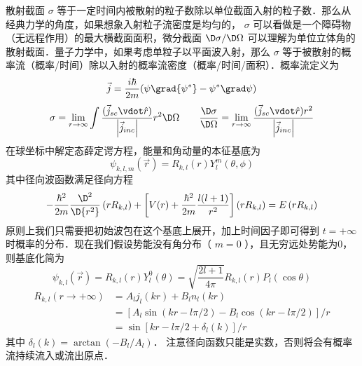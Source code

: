 
散射截面 $\sigma$ 等于一定时间内被散射的粒子数除以单位截面入射的粒子数．那么从经典力学的角度，如果想象入射粒子流密度是均匀的， $\sigma$ 可以看做是一个障碍物（无远程作用）的最大横截面面积，微分截面 $\D \sigma/\D\Omega$ 可以理解为单位立体角的散射截面．量子力学中，如果考虑单粒子以平面波入射，那么 $\sigma$ 等于被散射的概率流（概率/时间）除以入射的概率流密度（概率/时间/面积）．概率流定义为
\begin{equation}
\vec j = \frac{i\hbar }{2m}(\psi \grad {\psi ^ * } - {\psi ^ * }\grad \psi )
\end{equation}
\begin{equation}\label{ParWav_eq3}
\sigma  = \lim_{r \to \infty } \int {\frac{{\text{(}}{{\vec j}_{sc}} \vdot \hat r{\text{)}}}{\left| {{\vec j}_{inc}} \right|}{r^2}\D \Omega } 
\qquad
\frac{\D \sigma }{\D \Omega } = \lim_{r \to \infty } \frac{{\text{(}}{{\vec j}_{sc}} \vdot \hat r{\text{)}}{r^2}}{\left| {{\vec j}_{inc}} \right|}
\end{equation}
在球坐标中解定态薛定谔方程，能量和角动量的本征基底为
\begin{equation}
{\psi_{k,l,m}}(\vec r) = {R_{k,l}}(r)Y_l^m(\theta ,\phi )
\end{equation}
其中径向波函数满足径向方程
\begin{equation}\label{ParWav_eq4}
- \frac{\hbar ^2}{2m}\frac{\D ^2}{\D {r^2}}\left( {r{R_{k,l}}} \right) + \left[ {V(r) + \frac{\hbar ^2}{2m}\frac{l(l + 1)}{r^2}} \right]\left( {r{R_{k,l}}} \right) = E\left( {r{R_{k,l}}} \right)
\end{equation}
原则上我们只需要把初始波包在这个基底上展开，加上时间因子即可得到 $t =  + \infty$ 时概率的分布．现在我们假设势能没有角分布（ $m = 0$ ），且无穷远处势能为0，则基底化简为
\begin{equation}
{\psi_{k,l}}(\vec r) = {R_{k,l}}(r)Y_l^0(\theta ) = \sqrt {\frac{2l + 1}{4\pi }} {R_{k,l}}(r){P_l}(\cos \theta )
\end{equation}
\begin{equation}\begin{aligned}\label{ParWav_eq6}
{R_{k,l}}(r \to  + \infty ) &= {A_l}{j_l}(kr) + {B_l}{n_l}(kr) \\
&= [{A_l}\sin (kr - l\pi /2) - {B_l}\cos(kr - l\pi /2)]/r \\
&= \sin [kr - l\pi /2 + {\delta_l}(k)]/r
\end{aligned}\end{equation}
其中 ${\delta_l}(k) = \arctan ( { - {B_l}/{A_l}} )$． 注意径向函数只能是实数，否则将会有概率流持续流入或流出原点．

